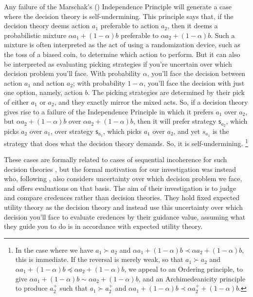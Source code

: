\documentclass[a4paper,final]{article}
\newcommand\s{\mathsf{s}}
\newenvironment{CCM rewritten}
{\begingroup\color{blue}} %
{\endgroup}              %
\begin{document}
Any failure of the Marschak's (\citeyear{marschak1950rb}) Independence Principle will generate a case where the decision theory is self-undermining.
This principle says that, if the decision theory deems action $a_1$ preferable to action $a_2$, then it deems a probabilistic mixture $\alpha a_1+(1-\alpha)b$ preferable to $\alpha a_2+(1-\alpha)b$. 
Such a mixture is often interpreted as the act of using a randomization device, such as the toss of a biased coin, to determine which action to perform. 
But it can also be interpreted as evaluating picking strategies if you're uncertain over which decision problem you'll face. With probability $\alpha$, you'll face the decision between action $a_1$ and action $a_2$; with probability $1-\alpha$, you'll face the decision with just one option, namely, action $b$. The picking strategies are determined by their pick of either $a_1$ or $a_2$, and they exactly mirror the mixed acts. So, if a decision theory gives rise to a failure of the Independence Principle in which it prefers $a_1$ over $a_2$, but $\alpha a_2+(1-\alpha)b$ over $\alpha a_2+(1-\alpha)b$, then it will prefer strategy $\s_{a_2}$, which picks $a_2$ over $a_1$, over strategy $\s_{a_1}$, which picks $a_1$ over $a_2$, and yet $s_{a_1}$ is the strategy that does what the decision theory demands. So, it is self-undermining.%
\footnote{
	In the case where we have $a_1\succ a_2$ and $\alpha a_1 +(1-\alpha)b\prec \alpha a_2 + (1-\alpha)b$, this is immediate. 
	If the reversal is merely weak, so that $a_1\succ a_2$ and $\alpha a_1 +(1-\alpha)b\preceq \alpha a_2 + (1-\alpha)b$, we appeal to an Ordering principle, to give $\alpha a_1 +(1-\alpha)b\sim \alpha a_2 + (1-\alpha)b$, and an Archimedeanicity principle to produce $a^+_2$ such that $a_1\succ a^+_2$ and $\alpha a_1 +(1-\alpha)b\prec \alpha a^+_2 + (1-\alpha)b$. 
}

These cases are formally related to cases of sequential incoherence for such decision theories \citep{hammond1988cfeu,machina1989}, but the formal motivation for our investigation was instead \citet{levinstein2017pgeu} who, following \citet{schervish2009psr}, also considers uncertainty over which decision problem we face, and offers evaluations on that basis. 
The aim of their investigation is to judge and compare credences rather than decision theories.
They hold fixed expected utility theory as the decision theory and instead use this uncertainty over which decision you'll face to evaluate credences by their guidance value, assuming what they guide you to do is in accordance with expected utility theory. 
\end{document}
